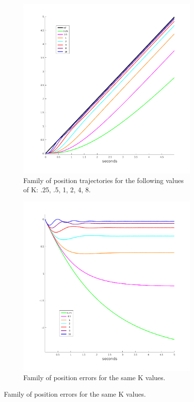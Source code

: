 \documentclass[11pt,a4paper]{article}
\begin{document}
\begin{enumerate}
\begin{figure}[!htbp]
	\centering
	\begin{subfigure}{.5\textwidth}
		\centering
		\includegraphics[width = \textwidth]{imglab/lab4sol_rampposkfam.png}
		\caption{Family of position trajectories for the following values of K: .25, .5, 1, 2, 4, 8.}
	\end{subfigure}%
	\begin{subfigure}{.5\textwidth}
		\centering
		\includegraphics[width = \textwidth]{imglab/lab4sol_rampposerr.png}
		\caption{Family of position errors for the same K values.}	
	\end{subfigure}
\end{figure}
	

\end{enumerate}
\end{document}
